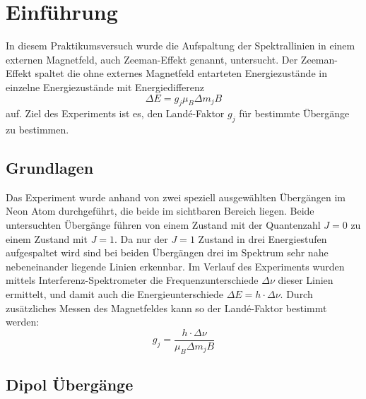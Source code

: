 \documentclass[a4paper,parskip,11pt, DIV12]{scrreprt}
\begin{document}
	
	
		\chapter{Einführung}
	
	In diesem Praktikumsversuch wurde die Aufspaltung der Spektrallinien in einem externen Magnetfeld, auch Zeeman-Effekt genannt, untersucht. Der Zeeman-Effekt spaltet die ohne externes Magnetfeld entarteten Energiezustände in einzelne Energiezustände mit Energiedifferenz
	\begin{equation}
	\label{Energiedifferenz}
	\Delta E = g_j \mu_B \Delta m_j B 
	\end{equation}
auf. Ziel des Experiments ist es, den Landé-Faktor $g_j $ für bestimmte Übergänge zu bestimmen. 

	\section{Grundlagen}
	Das Experiment wurde anhand von zwei speziell ausgewählten Übergängen im Neon Atom durchgeführt, die beide im sichtbaren Bereich liegen. Beide untersuchten Übergänge führen von einem Zustand mit der Quantenzahl $ J = 0 $ zu einem Zustand mit $J = 1$. Da nur der $J = 1$ Zustand in drei Energiestufen aufgespaltet wird sind bei beiden Übergängen drei im Spektrum sehr nahe nebeneinander liegende Linien erkennbar. Im Verlauf des Experiments wurden mittels Interferenz-Spektrometer die Frequenzunterschiede $\Delta \nu$  dieser Linien ermittelt, und damit auch die Energieunterschiede $\Delta E = h \cdot \Delta \nu$. Durch zusätzliches Messen des Magnetfeldes kann so der Landé-Faktor bestimmt werden:
	\begin{equation}
	\label{Landé-Faktor}
	g_j = \frac{h \cdot \Delta \nu}{\mu_B \Delta m_j B}
	\end{equation}
	\section{Dipol Übergänge}
\end{document}
